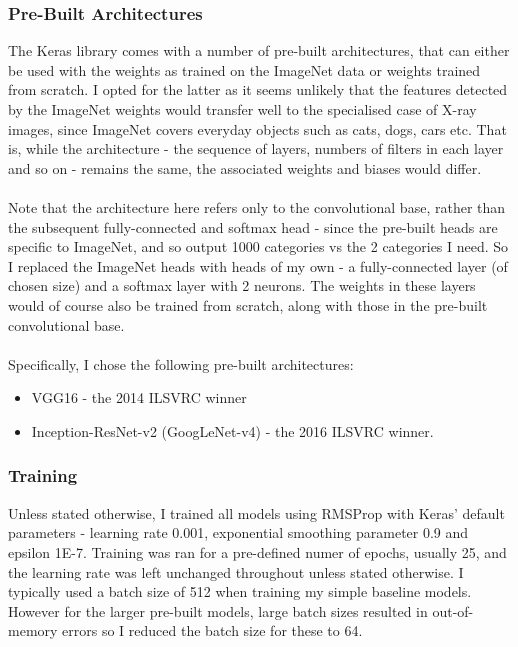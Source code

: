 \documentclass[11pt]{article} %
\theoremstyle{plain}
\theoremstyle{definition}
\begin{document}
\subsubsection{Pre-Built Architectures}
The Keras library comes with a number of pre-built architectures, that can either be used with the weights as trained on the ImageNet data or weights trained from scratch. I opted for the latter as it seems unlikely that the features detected by the ImageNet weights would transfer well to the specialised case of X-ray images, since ImageNet covers everyday objects such as cats, dogs, cars etc. That is, while the architecture - the sequence of layers, numbers of filters in each layer and so on - remains the same, the associated weights and biases would differ. 
\\
\\
\noindent
Note that the architecture here refers only to the convolutional base, rather than the subsequent fully-connected and softmax head - since the pre-built heads are specific to ImageNet, and so output 1000 categories vs the 2 categories I need. So I replaced the ImageNet heads with heads of my own - a fully-connected layer (of chosen size) and a softmax layer with 2 neurons. The weights in these layers would of course also be trained from scratch, along with those in the pre-built convolutional base.
\\
\\
\noindent
Specifically, I chose the following pre-built architectures:
\begin{itemize}
\item VGG16 - the 2014 ILSVRC winner
\item Inception-ResNet-v2 (GoogLeNet-v4) - the 2016 ILSVRC winner.
\end{itemize}
\subsubsection{Training}
Unless stated otherwise, I trained all models using RMSProp with Keras' default parameters - learning rate 0.001, exponential smoothing parameter 0.9 and epsilon 1E-7. Training was ran for a pre-defined numer of epochs, usually 25, and the learning rate was left unchanged throughout unless stated otherwise. I typically used a batch size of 512 when training my simple baseline models. However for the larger pre-built models, large batch sizes resulted in out-of-memory errors so I reduced the batch size for these to 64.
\end{document}
